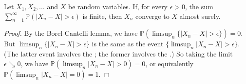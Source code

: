 \documentclass[12pt]{article}
\newcommand{\PP}{\mathbb{P}}
\providecommand{\abs}[1]{\lvert#1\rvert}
\begin{document}
Let $X_1, X_2, \dotsc$ and $X$ be random variables.
If, for every $\epsilon > 0$, the sum $\sum_{n=1}^\infty \PP( \abs{X_n - X} > \epsilon )$  is finite,
then $X_n$ converge to $X$ almost surely.

\begin{proof}
By the Borel-Cantelli lemma, we have $\PP(\limsup_n \{ \abs{X_n - X} > \epsilon \})=0 $.
But $\limsup_n \{ \abs{X_n - X} > \epsilon \}$ is the same as the event $\{ \limsup_n \abs{X_n - X} > \epsilon \}$.
(The latter event involves the ; the former involves the 
.)
So taking the limit $\epsilon \searrow 0$,
we have $\PP( \limsup_n \abs{X_n - X} > 0) = 0$, 
or equivalently
$\PP( \limsup_n \abs{X_n - X} = 0) = 1$.
\end{proof}

\end{document}

